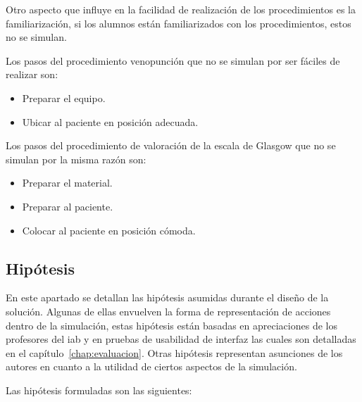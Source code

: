 \begin{itemize}
    Otro aspecto que influye en la facilidad de realización de los
    procedimientos es la familiarización, si los alumnos están familiarizados
    con los procedimientos, estos no se simulan.
        
    Los pasos del procedimiento venopunción que no se simulan por
    ser fáciles de realizar son:
        
    \begin{itemize}
        \item Preparar el equipo.
        \item Ubicar al paciente en posición adecuada.
    \end{itemize}
    
    Los pasos del procedimiento de valoración de la escala de Glasgow 
    que no se simulan por la misma razón son:
    \begin{itemize}
    \item Preparar el material.
    \item Preparar al paciente.
    \item Colocar al paciente en posición cómoda.
    \end{itemize}
        
\end{itemize}

\subsection{Hipótesis}
\label{sec:hipotesis}

En este apartado se detallan las hipótesis asumidas durante el diseño de 
la solución. Algunas de ellas envuelven la forma de representación de acciones 
dentro de la simulación, estas hipótesis están  basadas en apreciaciones de los 
profesores del \Gls{iab} y en pruebas de usabilidad de interfaz las cuales son 
detalladas en el capítulo~\ref{chap:evaluacion}. Otras hipótesis representan 
asunciones de los autores 
en cuanto a la utilidad de ciertos aspectos de la simulación.

Las hipótesis formuladas son las siguientes:

